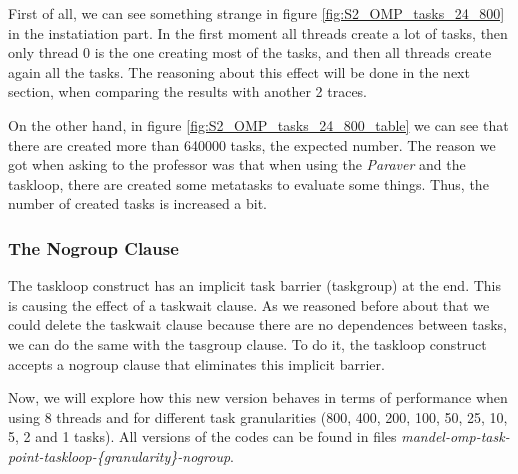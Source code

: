 \documentclass[12pt, a4paper]{article}
\begin{document}
First of all, we can see something strange in figure \ref{fig:S2_OMP_tasks_24_800} in the instatiation part. In the first moment all threads create a lot of tasks, then only thread 0 is the one creating most of the tasks, and then all threads create again all the tasks. The reasoning about this effect will be done in the next section, when comparing the results with another 2 traces.

On the other hand, in figure \ref{fig:S2_OMP_tasks_24_800_table} we can see that there are created more than 640000 tasks, the expected number. The reason we got when asking to the professor was that when using the \textit{Paraver} and the taskloop, there are created some metatasks to evaluate some things. Thus, the number of created tasks is increased a bit.

\subsubsection{The Nogroup Clause}

The taskloop construct has an implicit task barrier (taskgroup) at the end. This is causing the effect of a taskwait clause. As we reasoned before about that we could delete the taskwait clause because there are no dependences between tasks, we can do the same with the tasgroup clause. To do it, the taskloop construct accepts a nogroup clause that eliminates this implicit barrier.

Now, we will explore how this new version behaves in terms of performance when using 8 threads and for different task granularities (800, 400, 200, 100, 50, 25, 10, 5, 2 and 1 tasks). All versions of the codes can be found in files \textit{mandel-omp-task-point-taskloop-\{granularity\}-nogroup}.
\end{document}

